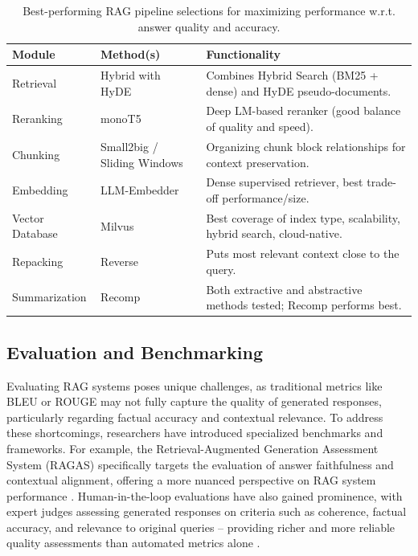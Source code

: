 \begin{spacing}{1.5}
\addtocounter{table}{-1}
\begin{table}[H]
\centering
\begin{tabularx}{\textwidth}{l>{\raggedright\arraybackslash}X>{\raggedright\arraybackslash}X}
\toprule
\textbf{Module}         & \textbf{Method(s)} & \textbf{Functionality} \\
\midrule
Retrieval         & Hybrid with HyDE            & Combines Hybrid Search (BM25 + dense) and HyDE pseudo-documents. \\
Reranking         & monoT5                      & Deep LM-based reranker (good balance of quality and speed). \\
Chunking          & Small2big / Sliding Windows & Organizing chunk block relationships for context preservation. \\
Embedding         & LLM-Embedder                & Dense supervised retriever, best trade-off performance/size. \\
Vector Database   & Milvus                      & Best coverage of index type, scalability, hybrid search, cloud-native. \\
Repacking         & Reverse                     & Puts most relevant context close to the query. \\
Summarization     & Recomp                      & Both extractive and abstractive methods tested; Recomp performs best. \\
\bottomrule
\end{tabularx}
\vspace{0.5em}
\caption{Best-performing RAG pipeline selections for maximizing performance w.r.t. answer quality and accuracy.}
\label{tab:best_rag}
\end{table}


\subsection{Evaluation and Benchmarking}
Evaluating RAG systems poses unique challenges, as traditional metrics like BLEU or ROUGE may not fully capture the quality of generated responses, particularly regarding factual accuracy and contextual relevance. To address these shortcomings, researchers have introduced specialized benchmarks and frameworks. For example, the Retrieval-Augmented Generation Assessment System (RAGAS) specifically targets the evaluation of answer faithfulness and contextual alignment, offering a more nuanced perspective on RAG system performance \citep{es_ragas_2023}. Human-in-the-loop evaluations have also gained prominence, with expert judges assessing generated responses on criteria such as coherence, factual accuracy, and relevance to original queries -- providing richer and more reliable quality assessments than automated metrics alone \citep{gupta_comprehensive_2024}.


\end{spacing}
